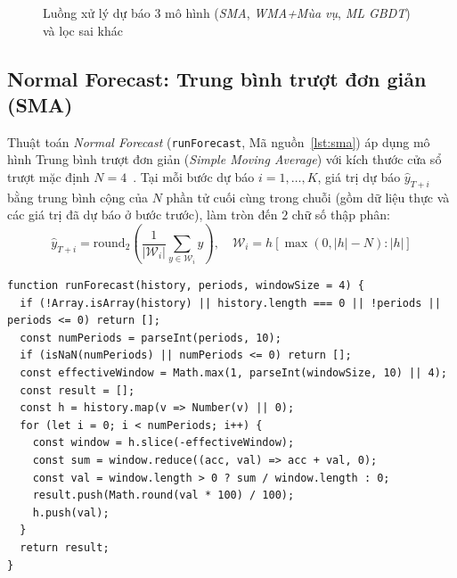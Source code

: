 \begin{figure}[H]
	\centering
	\caption{Luồng xử lý dự báo $3$ mô hình (\textit{SMA}, \textit{WMA+Mùa vụ}, \textit{ML GBDT}) và lọc sai khác}
	\label{fig:forecast_flow}
\end{figure}

\subsection{Normal Forecast: Trung bình trượt đơn giản (SMA)}
\label{sec:ch4-sma}
Thuật toán \textit{Normal Forecast} (\texttt{runForecast}, Mã nguồn~\ref{lst:sma}) áp dụng mô hình Trung bình trượt đơn giản (\textit{Simple Moving Average}) với kích thước cửa sổ trượt mặc định $N = 4$~\cite{hyndman2021forecasting}. Tại mỗi bước dự báo $i = 1, \dots, K$, giá trị dự báo $\hat{y}_{T+i}$ bằng trung bình cộng của $N$ phần tử cuối cùng trong chuỗi (gồm dữ liệu thực và các giá trị đã dự báo ở bước trước), làm tròn đến $2$ chữ số thập phân:
\begin{equation}
	\hat{y}_{T+i} = \text{round}_2\!\left(\dfrac{1}{|\mathcal{W}_i|}\displaystyle\sum_{y \in \mathcal{W}_i} y\right), \quad \mathcal{W}_i = h[\max(0, |h|-N) : |h|]
\end{equation}

\begin{listing}[H]
	\begin{verbatim}
function runForecast(history, periods, windowSize = 4) {
  if (!Array.isArray(history) || history.length === 0 || !periods || periods <= 0) return [];
  const numPeriods = parseInt(periods, 10);
  if (isNaN(numPeriods) || numPeriods <= 0) return [];
  const effectiveWindow = Math.max(1, parseInt(windowSize, 10) || 4);
  const result = [];
  const h = history.map(v => Number(v) || 0);
  for (let i = 0; i < numPeriods; i++) {
    const window = h.slice(-effectiveWindow);
    const sum = window.reduce((acc, val) => acc + val, 0);
    const val = window.length > 0 ? sum / window.length : 0;
    result.push(Math.round(val * 100) / 100);
    h.push(val);
  }
  return result;
}
\end{verbatim}
	\caption{Thuật toán Normal Forecast (SMA) trong \texttt{backend/algorithms/forecast.js}}
	\label{lst:sma}
\end{listing}

